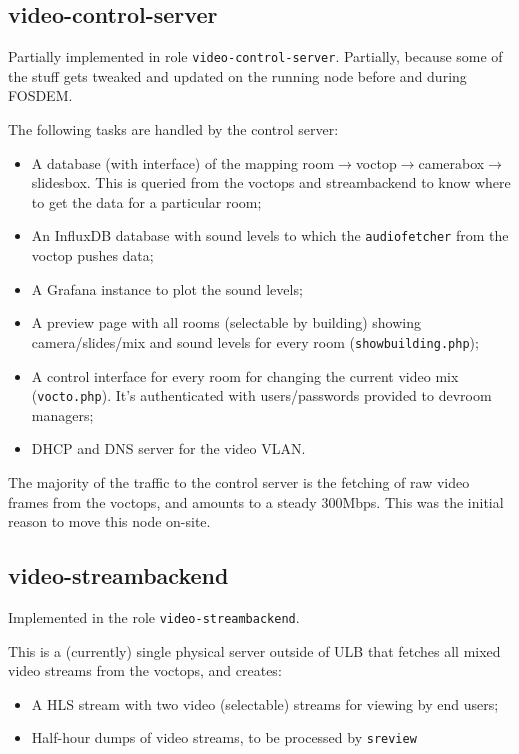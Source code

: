 \documentclass{article}
\begin{document}
\subsection{video-control-server}

Partially implemented in role \texttt{video-control-server}. Partially, because some of the stuff gets tweaked and updated on the running node before and during FOSDEM.

The following tasks are handled by the control server:

\begin{itemize}
  \item A database (with interface) of the mapping room$\rightarrow$voctop$\rightarrow$camerabox$\rightarrow$slidesbox. This is queried from the voctops and streambackend to know where to get the data for a particular room;
  \item An InfluxDB database with sound levels to which the \texttt{audiofetcher} from the voctop pushes data;
  \item A Grafana instance to plot the sound levels;
  \item A preview page with all rooms (selectable by building) showing camera/slides/mix and sound levels for every room (\texttt{showbuilding.php});
  \item A control interface for every room for changing the current video mix (\texttt{vocto.php}). It's authenticated with users/passwords provided to devroom managers;
  \item DHCP and DNS server for the video VLAN.
\end{itemize}

The majority of the traffic to the control server is the fetching of raw video frames from the voctops, and amounts to a steady 300Mbps. This was the initial reason to move this node on-site.

\subsection{video-streambackend}

Implemented in the role \texttt{video-streambackend}.

This is a (currently) single physical server outside of ULB that fetches all mixed video streams from the voctops, and creates:

\begin{itemize}
  \item A HLS stream with two video (selectable) streams for viewing by end users;
  \item Half-hour dumps of video streams, to be processed by \texttt{sreview}
\end{itemize}
\end{document}
